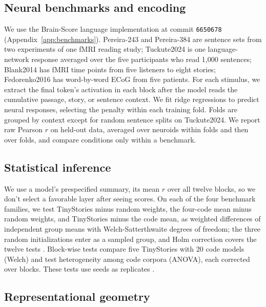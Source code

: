 \documentclass[mlmain]{jmlr}
\begin{document}
\subsection{Neural benchmarks and encoding}
\label{sec:benchmarks}

We use the Brain-Score language implementation \citep{schrimpf2020integrative} at commit \texttt{6650678} (Appendix~\ref{app:benchmarks}). Pereira-243 and Pereira-384 are sentence sets from two experiments of one fMRI reading study; Tuckute2024 is one language-network response averaged over the five participants who read 1,000 sentences; Blank2014 has fMRI time points from five listeners to eight stories; Fedorenko2016 has word-by-word ECoG from five patients. For each stimulus, we extract the final token's activation in each block after the model reads the cumulative passage, story, or sentence context. We fit ridge regressions to predict neural responses, selecting the penalty within each training fold. Folds are grouped by context except for random sentence splits on Tuckute2024. We report raw Pearson $r$ on held-out data, averaged over neuroids within folds and then over folds, and compare conditions only within a benchmark.

\subsection{Statistical inference}
\label{sec:stats}

We use a model's prespecified summary, its mean $r$ over all twelve blocks, so we don't select a favorable layer after seeing scores. On each of the four benchmark families, we test TinyStories minus random weights, the four-code mean minus random weights, and TinyStories minus the code mean, as weighted differences of independent group means with Welch-Satterthwaite degrees of freedom; the three random initializations enter as a sampled group, and Holm correction covers the twelve tests \citep{holm1979simple}. Block-wise tests compare five TinyStories with 20 code models (Welch) and test heterogeneity among code corpora (ANOVA), each corrected over blocks. These tests use seeds as replicates \citep{nadeau2003inference,bengio2004nounbiased,varoquaux2017decoders}.

\subsection{Representational geometry}
\label{sec:methods-geometry}
\end{document}
